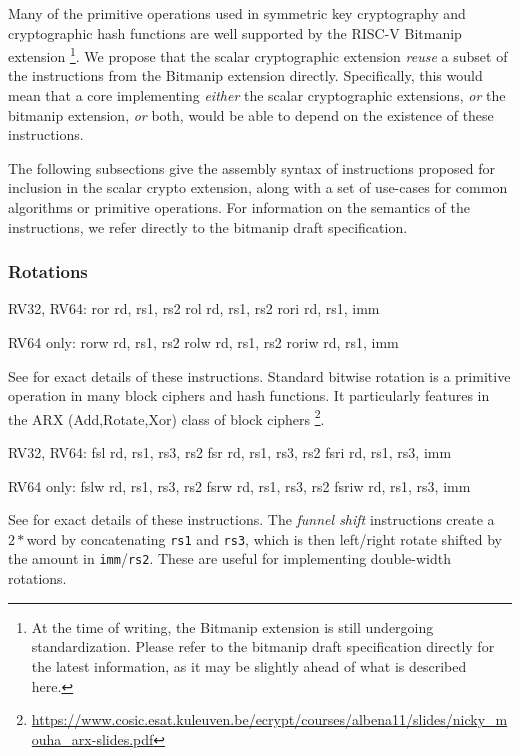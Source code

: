 Many of the primitive operations used in symmetric key cryptography
and cryptographic hash functions are well supported by the
RISC-V Bitmanip \cite{riscv:bitmanip:repo} extension
\footnote{
At the time of writing, the Bitmanip extension is still undergoing
standardization.
Please refer to the bitmanip draft specification
\cite{riscv:bitmanip:draft}
directly for the
latest information, as it may be slightly ahead of what is described
here.
}.
We propose that the scalar cryptographic extension {\em reuse} a
subset of the instructions from the Bitmanip extension directly.
Specifically, this would mean that
a core implementing
{\em either}
the scalar cryptographic extensions,
{\em or}
the bitmanip extension,
{\em or}
both,
would be able to depend on the existence of these instructions.

The following subsections give the assembly syntax of instructions
proposed for inclusion in the scalar crypto extension, along with a
set of use-cases for common algorithms or primitive operations.
For information on the semantics of the instructions, we refer directly
to the bitmanip draft specification.

\subsubsection{Rotations}

\begin{isa}
RV32, RV64:
    ror    rd, rs1, rs2
    rol    rd, rs1, rs2
    rori   rd, rs1, imm

RV64 only:
    rorw   rd, rs1, rs2
    rolw   rd, rs1, rs2
    roriw  rd, rs1, imm
\end{isa}

See \cite[Section 3.1.1]{riscv:bitmanip:draft} for exact details of
these instructions.
Standard bitwise rotation is a primitive operation in many block ciphers and
hash functions.
It particularly features in the ARX (Add,Rotate,Xor) class of
block ciphers
\footnote{\url{https://www.cosic.esat.kuleuven.be/ecrypt/courses/albena11/slides/nicky_mouha_arx-slides.pdf}}.

\begin{isa}
RV32, RV64:
    fsl   rd, rs1, rs3, rs2
    fsr   rd, rs1, rs3, rs2
    fsri  rd, rs1, rs3, imm

RV64 only:
    fslw  rd, rs1, rs3, rs2
    fsrw  rd, rs1, rs3, rs2
    fsriw rd, rs1, rs3, imm
\end{isa}

See \cite[Section 2.9.3]{riscv:bitmanip:draft} for exact details of
these instructions.
The {\em funnel shift} instructions create a $2*$\XLEN word by
concatenating {\tt rs1} and {\tt rs3}, which is then
left/right rotate shifted by the amount in {\tt imm}/{\tt rs2}.
These are useful for implementing double-width rotations.

